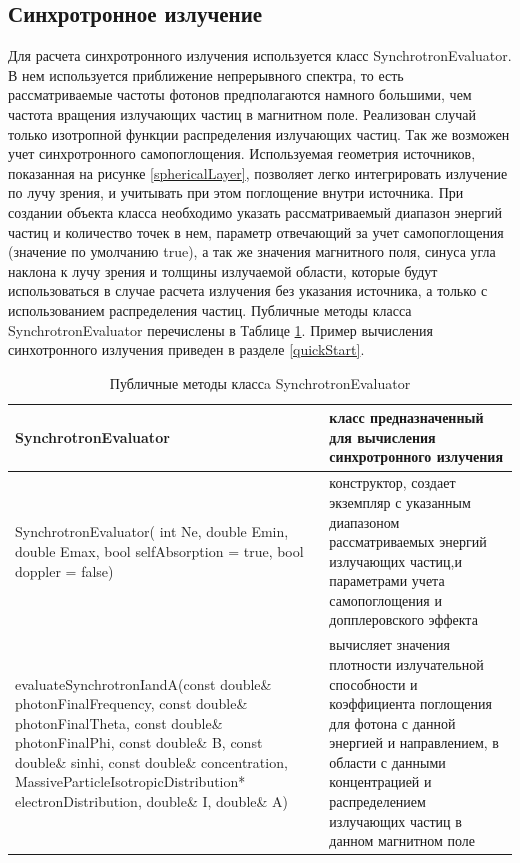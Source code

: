 \subsection{Синхротронное излучение}
Для расчета синхротронного излучения используется класс SynchrotronEvaluator. В нем используется приближение непрерывного спектра, то есть рассматриваемые частоты фотонов предполагаются намного большими, чем частота вращения излучающих частиц в магнитном поле. Реализован случай только изотропной функции распределения излучающих частиц. Так же возможен учет синхротронного самопоглощения. Используемая геометрия источников, показанная на рисунке \ref{sphericalLayer}, позволяет легко интегрировать излучение по лучу зрения, и учитывать при этом поглощение внутри источника. При создании объекта класса необходимо указать рассматриваемый диапазон энергий частиц и количество точек в нем, параметр отвечающий за учет самопоглощения (значение по умолчанию true), а так же значения магнитного поля, синуса угла наклона к лучу зрения и толщины излучаемой области, которые будут использоваться в случае расчета излучения без указания источника, а только с использованием распределения частиц. Публичные методы класса SynchrotronEvaluator перечислены в Таблице \ref{SynchrotronEvaluator}. Пример вычисления синхотронного излучения приведен в разделе \ref{quickStart}.
\begin{table}
	\begin{center}
	\begin{small}
	\caption{Публичные методы классa SynchrotronEvaluator }
	\label{SynchrotronEvaluator}
	\begin{tabularx}{\textwidth}{|X|X|} 
		\hline
		\textbf{SynchrotronEvaluator} & класс предназначенный для вычисления синхротронного излучения\\
		\hline
		SynchrotronEvaluator( int Ne, double Emin, double Emax, bool selfAbsorption = true, bool doppler = false) & конструктор, создает экземпляр с указанным диапазоном рассматриваемых энергий излучающих частиц,и параметрами учета самопоглощения и допплеровского эффекта\\
		\hline
		evaluateSynchrotronIandA(const double\& photonFinalFrequency, const double\& photonFinalTheta, const double\& photonFinalPhi, const double\& B, const double\& sinhi, const double\& concentration, MassiveParticleIsotropicDistribution* electronDistribution, double\& I, double\& A) & вычисляет значения плотности излучательной способности и коэффициента поглощения для фотона с данной энергией и направлением, в области с данными концентрацией и распределением излучающих частиц в данном магнитном поле\\
		\hline
	\end{tabularx}
\end{small}
\end{center}
\end{table}

